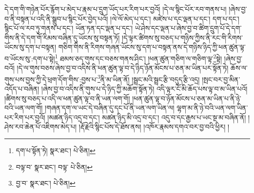 དེ་དག་གི་གཉེན་པོར་རྙོག་པ་མེད་པ་རྣམ་པ་དྲུག་ཡོད་པར་རིག་པར་བྱའོ། །དེ་ལ་སྙིང་པོར་རབ་གནས་པ། །ཞེས་བྱ་བ་ནི་བསྟན་པ་འདི་ནི་སྒྲུབ་པ་སྙིང་པོར་བྱེད་པའོ། །ལེ་ལོ་མེད་པ་དང་། མཛེས་པ་དང་ལྡན་པ་དང་། དག་པ་དང་། སྙིང་པོ་ལ་རབ་ཏུ་གནས་པ་དང་། ཡོན་ཏན་དང་ལྡན་པ་དང་། ཡེ་ཤེས་དང་ལྡན་པ་ཞེས་བྱ་བ་ཚིག་དྲུག་པོ་དེ་དག་གིས་ནི་དེ་དག་གོ་རིམས་བཞིན་དུ་ཡོངས་སུ་བསྟན་ཏོ། །དེ་ལྟར་ཚིགས་སུ་བཅད་པ་གཉིས་ཀྱིས་ནི་རང་གི་རིགས་ཡོངས་སུ་དག་པ་བསྟན། གཅིག་གིས་ནི་རིགས་གཞན་ཡོངས་སུ་དག་པ་བསྟན་ནས་དེ་གཉིས་ཉིད་ཀྱི་ཕན་ཚུན་ལྟ་བ་ཡོངས་སུ་:དག་པ་སྟེ།\footnote{དག་པ་སྟོན་ཏེ།  སྣར་ཐང་།  པེ་ཅིན། } ཐམས་ཅད་གུས་དང་བཅས་གནས་ཤིང་། །ཕན་ཚུན་གཅིག་ལ་གཅིག་ལྟ་\footnote{བལྟ་བ་  སྣར་ཐང་། བལྟ་  པེ་ཅིན། }སྟེ། །ཞེས་བྱ་བའོ། །དེ་ལ་གུས་བཅས་ཞེས་བྱ་བ་འདིས་ནི་ཕན་ཚུན་ལྟ་བ་དེ་ཉིད་ཉོན་མོངས་པ་ཅན་མ་ཡིན་པར་སྟོན་ཏེ། ཆོས་ལ་གུས་པས་བྱས་ཀྱི་དེ་ཕྲག་དོག་གིས་:བྱས་པ་\footnote{བྱ་བ་  སྣར་ཐང་།  པེ་ཅིན། }ནི་མ་ཡིན་ནོ། །སྦྲང་མའི་སྦྲང་རྩི་བདུད་རྩི་འདྲ། །སྤང་བར་བྱ་མིན་འདོད་པ་བཞིན། །ཞེས་བྱ་བ་འདིས་ནི་གུས་པ་དེ་ཉིད་ཀྱི་མཆོག་སྟོན་ཏེ། འདི་ལྟར་ངོ་མི་ཆོད་པས་ལྟ་བ་མ་ཡིན་པའོ། །ཚིགས་སུ་བཅད་པ་འདི་ལ་ཕན་ཚུན་ལྟ་བ་ནི་ཡན་ལག་གོ། །ཕན་ཚུན་ལྟ་བ་ཉོན་མོངས་པ་ཅན་མ་ཡིན་པ་ནི་ཉེ་བའི་ཡན་ལག་གོ། །གཞན་དག་ལ་ཡང་དེ་བཞིན་དུ་དང་པོ་ནི་ཡན་ལག་ཡིན་ལ། ལྷག་མ་ནི་ཉེ་བའི་ཡན་ལག་ཡིན་པར་རིག་པར་བྱའོ། །མཚན་ཉིད་འདྲ་བ་དང་། མཚན་ཉིད་མི་འདྲ་བ་དང་། འདུ་བ་དང་རྒྱས་པ་ཡང་སྔ་མ་བཞིན་ནོ། །ཤེས་རབ་ཆེན་པོ་འཇིགས་མེད་པ། །རྡོ་རྗེའི་སྙིང་པོས་དེ་ཐོས་ནས། །འཁོར་རྣམས་དགའ་བར་བྱ་བའི་ཕྱིར། །
